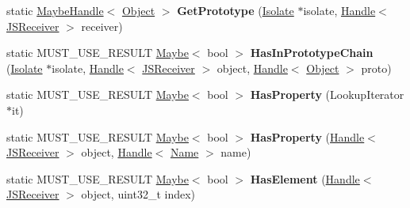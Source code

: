 \begin{DoxyCompactItemize}
\item 
static \hyperlink{classv8_1_1internal_1_1_maybe_handle}{Maybe\+Handle}$<$ \hyperlink{classv8_1_1internal_1_1_object}{Object} $>$ {\bfseries Get\+Prototype} (\hyperlink{classv8_1_1internal_1_1_isolate}{Isolate} $\ast$isolate, \hyperlink{classv8_1_1internal_1_1_handle}{Handle}$<$ \hyperlink{classv8_1_1internal_1_1_j_s_receiver}{J\+S\+Receiver} $>$ receiver)\hypertarget{classv8_1_1internal_1_1_j_s_receiver_a57cf7cac1c2e36676422ce43487df0ae}{}\label{classv8_1_1internal_1_1_j_s_receiver_a57cf7cac1c2e36676422ce43487df0ae}

\item 
static M\+U\+S\+T\+\_\+\+U\+S\+E\+\_\+\+R\+E\+S\+U\+LT \hyperlink{classv8_1_1_maybe}{Maybe}$<$ bool $>$ {\bfseries Has\+In\+Prototype\+Chain} (\hyperlink{classv8_1_1internal_1_1_isolate}{Isolate} $\ast$isolate, \hyperlink{classv8_1_1internal_1_1_handle}{Handle}$<$ \hyperlink{classv8_1_1internal_1_1_j_s_receiver}{J\+S\+Receiver} $>$ object, \hyperlink{classv8_1_1internal_1_1_handle}{Handle}$<$ \hyperlink{classv8_1_1internal_1_1_object}{Object} $>$ proto)\hypertarget{classv8_1_1internal_1_1_j_s_receiver_ac770c3b97cf27893711e85380d1965d9}{}\label{classv8_1_1internal_1_1_j_s_receiver_ac770c3b97cf27893711e85380d1965d9}

\item 
static M\+U\+S\+T\+\_\+\+U\+S\+E\+\_\+\+R\+E\+S\+U\+LT \hyperlink{classv8_1_1_maybe}{Maybe}$<$ bool $>$ {\bfseries Has\+Property} (Lookup\+Iterator $\ast$it)\hypertarget{classv8_1_1internal_1_1_j_s_receiver_ad0df2ef8ddcadcd2c2d7d96b19b7c3d3}{}\label{classv8_1_1internal_1_1_j_s_receiver_ad0df2ef8ddcadcd2c2d7d96b19b7c3d3}

\item 
static M\+U\+S\+T\+\_\+\+U\+S\+E\+\_\+\+R\+E\+S\+U\+LT \hyperlink{classv8_1_1_maybe}{Maybe}$<$ bool $>$ {\bfseries Has\+Property} (\hyperlink{classv8_1_1internal_1_1_handle}{Handle}$<$ \hyperlink{classv8_1_1internal_1_1_j_s_receiver}{J\+S\+Receiver} $>$ object, \hyperlink{classv8_1_1internal_1_1_handle}{Handle}$<$ \hyperlink{classv8_1_1internal_1_1_name}{Name} $>$ name)\hypertarget{classv8_1_1internal_1_1_j_s_receiver_af1a2320c78d9be111d0baf12ebde58d1}{}\label{classv8_1_1internal_1_1_j_s_receiver_af1a2320c78d9be111d0baf12ebde58d1}

\item 
static M\+U\+S\+T\+\_\+\+U\+S\+E\+\_\+\+R\+E\+S\+U\+LT \hyperlink{classv8_1_1_maybe}{Maybe}$<$ bool $>$ {\bfseries Has\+Element} (\hyperlink{classv8_1_1internal_1_1_handle}{Handle}$<$ \hyperlink{classv8_1_1internal_1_1_j_s_receiver}{J\+S\+Receiver} $>$ object, uint32\+\_\+t index)\hypertarget{classv8_1_1internal_1_1_j_s_receiver_a7f7a992ed1a978f2137dbe851175399d}{}\label{classv8_1_1internal_1_1_j_s_receiver_a7f7a992ed1a978f2137dbe851175399d}


\end{DoxyCompactItemize}

